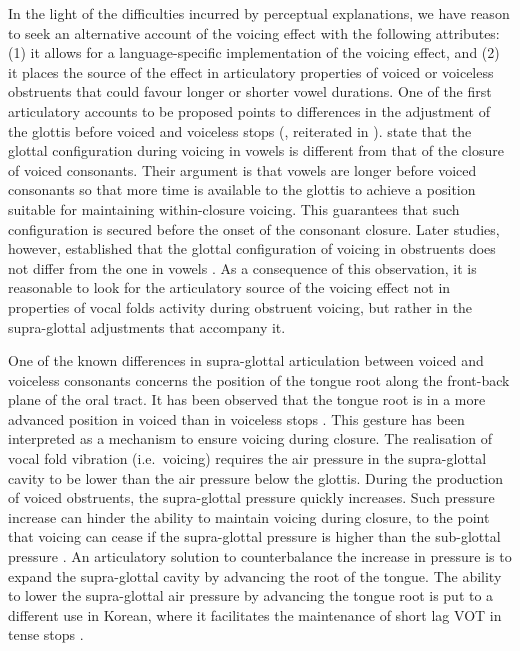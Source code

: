 \documentclass[authoryear, 5p]{elsarticle}
\begin{document}
In the light of the difficulties incurred by perceptual explanations, we
have reason to seek an alternative account of the voicing effect with
the following attributes: (1) it allows for a language-specific
implementation of the voicing effect, and (2) it places the source of
the effect in articulatory properties of voiced or voiceless obstruents
that could favour longer or shorter vowel durations. One of the first
articulatory accounts to be proposed points to differences in the
adjustment of the glottis before voiced and voiceless stops
(\citealt{halle1967}, reiterated in \citealt{chomsky1968}).
\citet{halle1967} state that the glottal configuration during voicing in
vowels is different from that of the closure of voiced consonants. Their
argument is that vowels are longer before voiced consonants so that more
time is available to the glottis to achieve a position suitable for
maintaining within-closure voicing. This guarantees that such
configuration is secured before the onset of the consonant closure.
Later studies, however, established that the glottal configuration of
voicing in obstruents does not differ from the one in vowels
\citep{lisker1974,kagaya1975}. As a consequence of this observation, it
is reasonable to look for the articulatory source of the voicing effect
not in properties of vocal folds activity during obstruent voicing, but
rather in the supra-glottal adjustments that accompany it.

One of the known differences in supra-glottal articulation between
voiced and voiceless consonants concerns the position of the tongue root
along the front-back plane of the oral tract. It has been observed that
the tongue root is in a more advanced position in voiced than in
voiceless stops \citep{kent1969,perkell1969,westbury1983}. This gesture
has been interpreted as a mechanism to ensure voicing during closure.
The realisation of vocal fold vibration (i.e.~voicing) requires the air
pressure in the supra-glottal cavity to be lower than the air pressure
below the glottis. During the production of voiced obstruents, the
supra-glottal pressure quickly increases. Such pressure increase can
hinder the ability to maintain voicing during closure, to the point that
voicing can cease if the supra-glottal pressure is higher than the
sub-glottal pressure \citep{ohala2011}. An articulatory solution to
counterbalance the increase in pressure is to expand the supra-glottal
cavity by advancing the root of the tongue. The ability to lower the
supra-glottal air pressure by advancing the tongue root is put to a
different use in Korean, where it facilitates the maintenance of short
lag VOT in tense stops \citep{ahn2016}.
\end{document}
